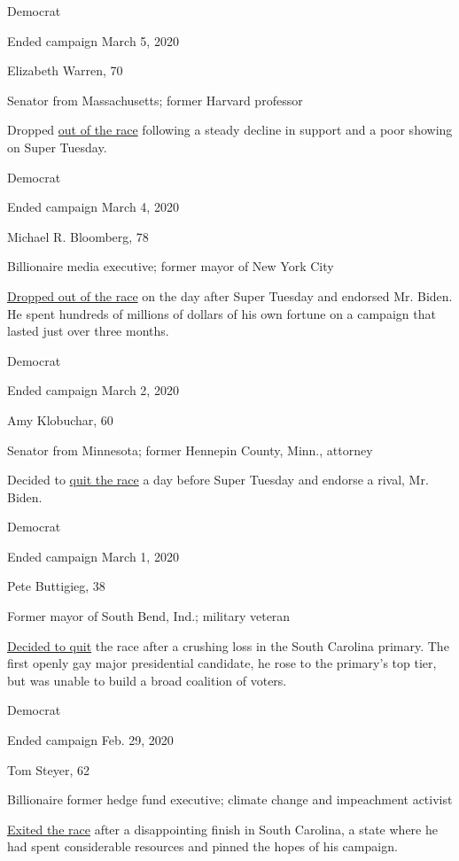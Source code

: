 Democrat

Ended campaign March 5, 2020

Elizabeth Warren, 70

Senator from Massachusetts; former Harvard professor

Dropped
\href{https://www.nytimes3xbfgragh.onion/2020/03/05/us/politics/elizabeth-warren-drops-out.html}{out
of the race} following a steady decline in support and a poor showing on
Super Tuesday.

Democrat

Ended campaign March 4, 2020

Michael R. Bloomberg, 78

Billionaire media executive; former mayor of New York City

\href{https://www.nytimes3xbfgragh.onion/2020/03/04/us/politics/michael-bloomberg-drops-out.html}{Dropped
out of the race} on the day after Super Tuesday and endorsed Mr. Biden.
He spent hundreds of millions of dollars of his own fortune on a
campaign that lasted just over three months.

Democrat

Ended campaign March 2, 2020

Amy Klobuchar, 60

Senator from Minnesota; former Hennepin County, Minn., attorney

Decided to
\href{https://www.nytimes3xbfgragh.onion/2020/03/02/us/politics/amy-klobuchar-drops-out.html}{quit
the race} a day before Super Tuesday and endorse a rival, Mr. Biden.

Democrat

Ended campaign March 1, 2020

Pete Buttigieg, 38

Former mayor of South Bend, Ind.; military veteran

\href{https://www.nytimes3xbfgragh.onion/2020/03/01/us/politics/pete-buttigieg-drops-out.html}{Decided
to quit} the race after a crushing loss in the South Carolina primary.
The first openly gay major presidential candidate, he rose to the
primary's top tier, but was unable to build a broad coalition of voters.

Democrat

Ended campaign Feb. 29, 2020

Tom Steyer, 62

Billionaire former hedge fund executive; climate change and impeachment
activist

\href{https://www.nytimes3xbfgragh.onion/2020/02/29/us/politics/tom-steyer-drops-out.html}{Exited
the race} after a disappointing finish in South Carolina, a state where
he had spent considerable resources and pinned the hopes of his
campaign.

